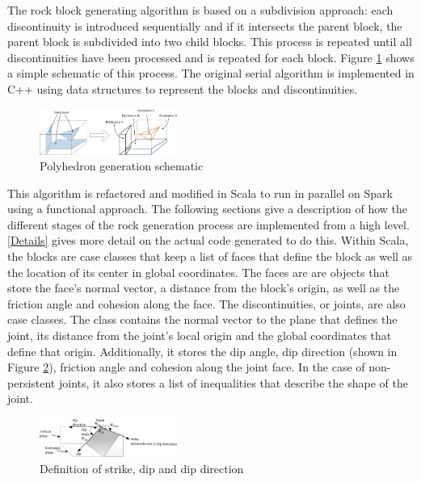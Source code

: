 The rock block generating algorithm is based on a subdivision approach: each discontinuity is introduced sequentially and if it intersects the parent block, the parent block is subdivided into two child blocks. This process is repeated until all discontinuities have been processed and is repeated for each block. Figure \ref{fig:SlicingIllustration} shows a simple schematic of this process. The original serial algorithm is implemented in C++ using data structures to represent the blocks and discontinuities. \par

\begin{figure}[h]
  \centering
  \includegraphics[width=0.4\textwidth]{SlicingIllustration}
  \caption{Polyhedron generation schematic \cite{slicing}}
  \label{fig:SlicingIllustration}
\end{figure}

This algorithm is refactored and modified in Scala to run in parallel on Spark using a functional approach. The following sections give a description of how the different stages of the rock generation process are implemented from a high level. \ref{Details} gives more detail on the actual code generated to do this.  Within Scala, the blocks are case classes that keep a list of faces that define the block as well as the location of its center in global coordinates. The faces are are objects that store the face's normal vector, a distance from the block's origin, as well as the friction angle and cohesion along the face. The discontinuities, or joints, are also case classes. The class contains the normal vector to the plane that defines the joint, its distance from the joint's local origin and the global coordinates that define that origin. Additionally, it stores the dip angle, dip direction (shown in Figure \ref{fig:DipFig}), friction angle and cohesion along the joint face. In the case of non-persistent joints, it also stores a list of inequalities that describe the shape of the joint.

\begin {figure}[h]
  \centering
  \includegraphics[width=0.4\textwidth]{DipFig}
  \caption{Definition of strike, dip and dip direction \cite{slicing}}
  \label{fig:DipFig}
\end{figure}

